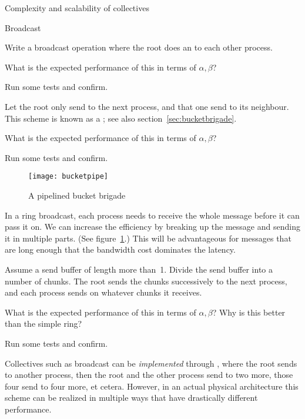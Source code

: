  {Complexity and scalability of collectives}

 {Broadcast}


Write a broadcast operation where the root does an  to
each other process.

What is the expected performance of this in terms of $\alpha,\beta$?

Run some tests and confirm.


Let the root only send to the next process, and that one send to its
neighbour. This scheme is known as a ; see
also section~\ref{sec:bucketbrigade}.

What is the expected performance of this in terms of $\alpha,\beta$?

Run some tests and confirm.

\begin{figure}[ht]
  \texttt{[image: bucketpipe]}
  \caption{A pipelined bucket brigade}
  \label{fig:pipe-bucket}
\end{figure}


In a ring broadcast, each process needs to receive the whole message
before it can pass it on. We can increase the efficiency by breaking
up the message and sending it in multiple parts.
(See figure~\ref{fig:pipe-bucket}.)
This will be
advantageous for messages that are long enough that the bandwidth cost
dominates the latency.

Assume a send buffer of length more than~1. Divide the send buffer
into a number of chunks. The root sends the chunks successively to the
next process, and each process sends on whatever chunks it receives.

What is the expected performance of this in terms of $\alpha,\beta$?
Why is this better than the simple ring?

Run some tests and confirm.


Collectives such as broadcast can be
\emph{implemented}
through
%
,
where the root sends to another process, then the root and the other
process send to two more, those four send to four more, et cetera.
However, in an actual physical architecture this scheme can be
realized in multiple ways that have drastically different performance.

